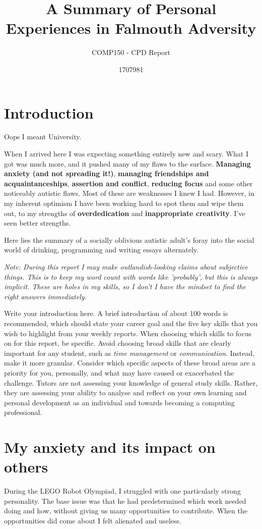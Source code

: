 \documentclass{scrartcl}
\title{A Summary of Personal Experiences in Falmouth Adversity}
\subtitle{COMP150 - CPD Report}
\author{1707981}
\begin{document}
\maketitle

\section{Introduction}
Oops I meant University.

When I arrived here I was expecting something entirely new and scary. What I got was much more, and it pushed many of my flaws to the surface. \textbf{Managing anxiety (and not spreading it!)}, \textbf{managing friendships and acquaintanceships}, \textbf{assertion and conflict}, \textbf{reducing focus} and some other noticeably autistic flaws. Most of these are weaknesses I knew I had. However, in my inherent optimism I have been working hard to spot them and wipe them out, to my strengths of \textbf{overdedication} and \textbf{inappropriate creativity}. I've seen better strengths.

Here lies the summary of a socially oblivious autistic adult's foray into the social world of drinking, programming and writing essays alternately.

\textit{Note: During this report I may make outlandish-looking claims about subjective things. This is to keep my word count with words like 'probably', but this is always implicit. These are holes in my skills, so I don't I have the mindset to find the right answers immediately.}

Write your introduction here. A brief introduction of about 100 words is recommended, which should state your career goal and the five key skills that you wish to highlight from your weekly reports. When choosing which skills to focus on for this report, be specific. Avoid choosing broad skills that are clearly important for any student, such as \textit{time management} or \textit{communication}. Instead, make it more granular. Consider which specific aspects of these broad areas are a priority for you, personally, and what may have caused or exacerbated the challenge. Tutors are not assessing your knowledge of general study skills. Rather, they are assessing your ability to analyse and reflect on your own learning and personal development as an individual and towards becoming a computing professional.

\section{My anxiety and its impact on others}
During the LEGO Robot Olympiad, I struggled with one particularly strong personality. The base issue was that he had predetermined which work needed doing and how, without giving us many opportunities to contribute. When the opportunities did come about I felt alienated and useless.
\end{document}
